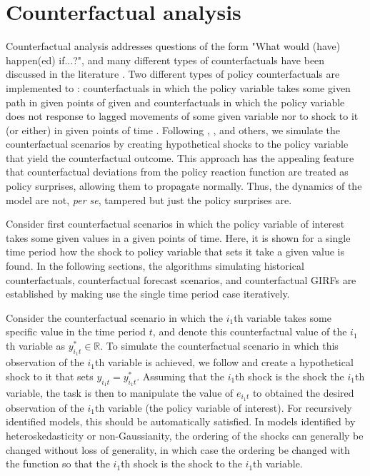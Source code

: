 \documentclass[nojss]{jss}
\begin{document}
\section{Counterfactual analysis}\label{sec:cfact}

Counterfactual analysis addresses questions of the form "What would (have) happen(ed) if...?", and many different types of counterfactuals have been discussed in the literature \citep[see, e.g.,][Chapter~4, and the references therein]{Kilian+Lutkepohl:2017}. Two different types of policy counterfactuals are implemented to : counterfactuals in which the policy variable takes some given path in given points of given \citep[e.g.,][]{Bernanke+Gertler+Watson:1997} and counterfactuals in which the policy variable does not response to lagged movements of some given variable nor to shock to it (or either) in given points of time \citep[e.g.,][]{Kilian+Lewis:2011}. Following \cite{Bernanke+Gertler+Watson:1997}, \cite{Kilian+Lewis:2011}, and others, we simulate the counterfactual scenarios by creating hypothetical shocks to the policy variable that yield the counterfactual outcome. This approach has the appealing feature that counterfactual deviations from the policy reaction function are treated as policy surprises, allowing them to propagate normally. Thus, the dynamics of the model are not, \textit{per se}, tampered but just the policy surprises are.

Consider first counterfactual scenarios in which the policy variable of interest takes some given values in a given points of time. Here, it is shown for a single time period how the shock to policy variable that sets it take a given value is found. In the following sections, the algorithms simulating historical counterfactuals, counterfactual forecast scenarios, and counterfactual GIRFs are established by making use the single time period case iteratively.

Consider the counterfactual scenario in which the $i_1$th variable takes some specific value in the time period $t$, and denote this counterfactual value of the $i_1$th variable as $y_{i_1t}^{*}\in\mathbb{R}$. To simulate the counterfactual scenario in which this observation of the $i_1$th variable is achieved, we follow \cite{Bernanke+Gertler+Watson:1997} and create a hypothetical shock to it that sets $y_{i_1t}=y_{i_1t}^{*}$. Assuming that the $i_1$th shock is the shock the $i_1$th variable, the task is then to manipulate the value of $e_{i_1t}$ to obtained the desired observation of the $i_1$th variable (the policy variable of interest). For recursively identified models, this should be automatically satisfied. In models identified by heteroskedasticity or non-Gaussianity, the ordering of the shocks can generally be changed without loss of generality, in which case the ordering be changed with the function  so that the $i_1$th shock is the shock to the $i_1$th variable.
\end{document}

